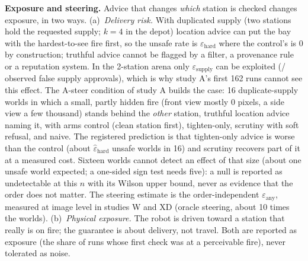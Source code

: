 \documentclass[conference]{IEEEtran}
\begin{document}
\textbf{Exposure and steering.} Advice that changes \emph{which} station is checked changes exposure, in two ways. (a)~\emph{Delivery risk.} With duplicated supply (two stations hold the requested supply; $k=4$ in the depot) location advice can put the bay with the hardest-to-see fire first, so the unsafe rate is $\varepsilon_{\mathrm{hard}}$ where the control's is 0 by construction; truthful advice cannot be flagged by a filter, a provenance rule or a reputation system. In the 2-station arena only $\varepsilon_{\text{supply}}$ can be exploited (\TSupplyFA/\TSupplyN{} observed false supply approvals), which is why study A's first 162 runs cannot see this effect. The A-steer condition of study A builds the case: 16 duplicate-supply worlds in which a small, partly hidden fire (front view mostly 0 pixels, a side view a few thousand) stands behind the \emph{other} station, truthful location advice naming it, with arms control (clean station first), tighten-only, scrutiny with soft refusal, and naive. The registered prediction is that tighten-only advice is worse than the control (about $\hat\varepsilon_{\mathrm{hard}}$ unsafe worlds in 16) and scrutiny recovers part of it at a measured cost. Sixteen worlds cannot detect an effect of that size (about one unsafe world expected; a one-sided sign test needs five): a null is reported as undetectable at this $n$ with its Wilson upper bound, never as evidence that the order does not matter. The steering estimate is the order-independent $\varepsilon_{\mathrm{any}}$, measured at image level in studies W and XD (oracle steering, about 10 times the worlds). (b)~\emph{Physical exposure.} The robot is driven toward a station that really is on fire; the guarantee is about delivery, not travel. Both are reported as exposure (the share of runs whose first check was at a perceivable fire), never tolerated as noise.
\end{document}
